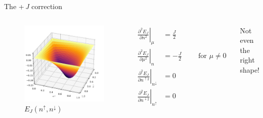 \documentclass[xcolor=table,aspectratio=169]{beamer}
\numberwithin{equation}{section}
\begin{document}
\begin{frame}{The +\,\emph{J} correction}
    \begin{columns}
        \begin{figure}[h!]
            \includegraphics[width=0.7\columnwidth]{figures/j_correction.pdf}
            \caption{$E_{J}(n^\uparrow,n^\downarrow)$}
            \label{fig:j_correction}
        \end{figure}
        \footnotesize
        \begin{subequations}
            \begin{align*}
                \left.\frac{\partial^2E_{J}}{\partial n^2}\right|_{\mu}                     & = \frac{J}{2}                                 \\
                \left.\frac{\partial^2E_{J}}{\partial\mu^2}\right|_{n}                      & = -\frac{J}{2} \qquad \text{ for } \mu \neq 0 \\
                \left.\frac{\partial^2E_{J}}{\partial n^{\uparrow 2}}\right|_{n^\downarrow} & = 0                                           \\
                \left.\frac{\partial^2E_{J}}{\partial n^{\downarrow 2}}\right|_{n^\uparrow} & = 0
            \end{align*}
        \end{subequations}

        Not even the right shape!
    \end{columns}
\end{frame}
\end{document}
